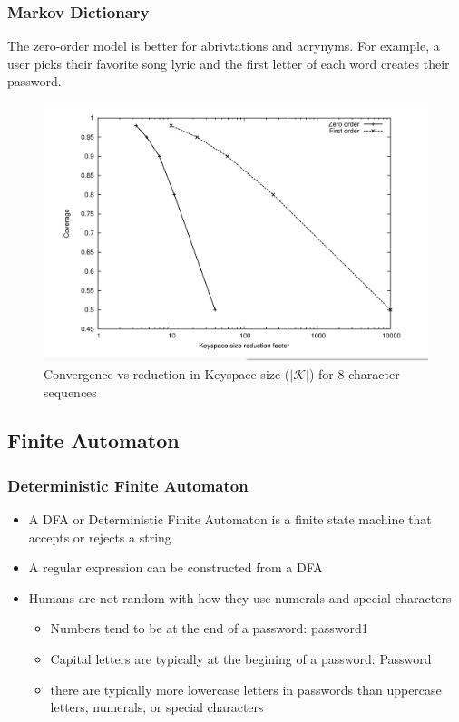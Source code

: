 \documentclass{beamer}
\begin{document}
\begin{frame}
\frametitle{Markov Dictionary}
The zero-order model is better for abrivtations and acrynyms. For example, a user picks their favorite song lyric and the first letter of each word creates their password.
\begin{figure}
\includegraphics[width=0.6\linewidth]{figs/dict_plot}
\caption{Convergence vs reduction in Keyspace size ($|\mathcal{K}|$) for 8-character sequences}
\end{figure}
\end{frame}

\subsection{Finite Automaton}
\begin{frame}
\frametitle{Deterministic Finite Automaton}
\begin{itemize}
\item A DFA or Deterministic Finite Automaton is a finite state machine that accepts or rejects a string
\item A regular expression can be constructed from a DFA
\item Humans are not random with how they use numerals and special characters
\begin{itemize}
\item Numbers tend to be at the end of a password: password1
\item Capital letters are typically at the begining of a password: Password
\item there are typically more lowercase letters in passwords than uppercase letters, numerals, or special characters
\end{itemize}
\end{itemize}
\end{frame}
\end{document}
